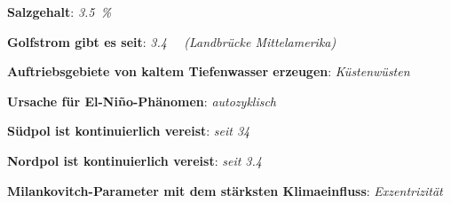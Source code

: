\begin{wichtig}
    \item
    \textbf{Salzgehalt}:
    \emph{\SI[math-rm=\mathit,text-rm=\itshape]{3.5}{\percent}}

    \item
    \textbf{Golfstrom gibt es seit}:
    \emph{\SI[math-rm=\mathit,text-rm=\itshape]{3.4}{\mega\year} (Landbrücke Mittelamerika)}

    \item
    \textbf{Auftriebsgebiete von kaltem Tiefenwasser erzeugen}:
    \emph{Küstenwüsten}

    \item
    \textbf{Ursache für El-Niño-Phänomen}:
    \emph{autozyklisch}

    \item
    \textbf{Südpol ist kontinuierlich vereist}:
    \emph{seit \SI[math-rm=\mathit,text-rm=\itshape]{34}{\mega\year}}

    \item
    \textbf{Nordpol ist kontinuierlich vereist}:
    \emph{seit \SI[math-rm=\mathit,text-rm=\itshape]{3.4}{\mega\year}}

    \item
    \textbf{Milankovitch-Parameter mit dem stärksten Klimaeinfluss}:
    \emph{Exzentrizität}
\end{wichtig}

\pagebreak
